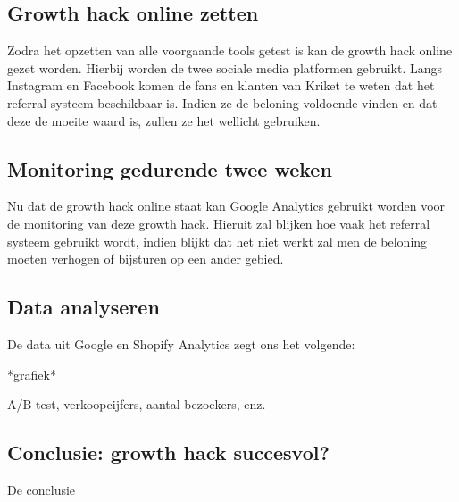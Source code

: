 \subsection{Growth hack online zetten} \label{sec:growth-hack-online-zetten}
Zodra het opzetten van alle voorgaande tools getest is kan de growth hack online gezet worden. Hierbij worden de twee sociale media platformen gebruikt. Langs Instagram en Facebook komen de fans en klanten van Kriket te weten dat het referral systeem beschikbaar is. Indien ze de beloning voldoende vinden en dat deze de moeite waard is, zullen ze het wellicht gebruiken. 

\subsection{Monitoring gedurende twee weken} \label{sec:monitoring-gedurende-twee-weken}
Nu dat de growth hack online staat kan Google Analytics gebruikt worden voor de monitoring van deze growth hack. Hieruit zal blijken hoe vaak het referral systeem gebruikt wordt, indien blijkt dat het niet werkt zal men de beloning moeten verhogen of bijsturen op een ander gebied.

\subsection{Data analyseren} \label{sec:data-analyseren}
De data uit Google en Shopify Analytics zegt ons het volgende:

*grafiek*

A/B test, verkoopcijfers, aantal bezoekers, enz.

\subsection{Conclusie: growth hack succesvol?} \label{sec:conclusie-growth-hack-succesvol}
De conclusie
